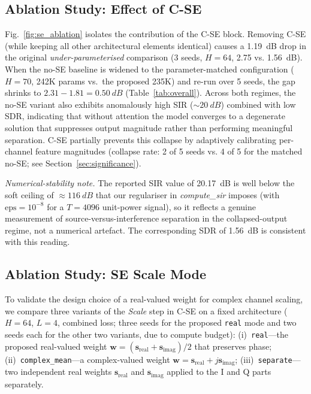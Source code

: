 \documentclass[twocolumn,english]{svjour3}
\begin{document}
\subsection{Ablation Study: Effect of C-SE}

Fig.~\ref{fig:se_ablation} isolates the contribution of the C-SE block. Removing C-SE (while keeping all other architectural elements identical) causes a \SI{1.19}{dB} drop in the original \emph{under-parameterised} comparison (3 seeds, $H{=}64$, \num{2.75} vs. \num{1.56}~dB). When the no-SE baseline is widened to the parameter-matched configuration ($H{=}70$, 242K params vs.\ the proposed 235K) and re-run over 5 seeds, the gap shrinks to $\num{2.31} - \num{1.81} = \SI{0.50}{dB}$ (Table~\ref{tab:overall}). Across both regimes, the no-SE variant also exhibits anomalously high SIR ($\sim\SI{20}{dB}$) combined with low SDR, indicating that without attention the model converges to a degenerate solution that suppresses output magnitude rather than performing meaningful separation. C-SE partially prevents this collapse by adaptively calibrating per-channel feature magnitudes (collapse rate: 2 of 5 seeds vs. 4 of 5 for the matched no-SE; see Section~\ref{sec:significance}).

\emph{Numerical-stability note.} The reported SIR value of \qty{20.17}{dB} is well below the soft ceiling of $\approx\SI{116}{dB}$ that our regulariser in \emph{compute\_sir} imposes (with $\text{eps}=10^{-8}$ for a $T{=}4096$ unit-power signal), so it reflects a genuine measurement of source-versus-interference separation in the collapsed-output regime, not a numerical artefact. The corresponding SDR of \qty{1.56}{dB} is consistent with this reading.

\subsection{Ablation Study: SE Scale Mode}

To validate the design choice of a real-valued weight for complex channel scaling, we compare three variants of the \emph{Scale} step in C-SE on a fixed architecture ($H{=}64$, $L{=}4$, combined loss; three seeds for the proposed \texttt{real} mode and two seeds each for the other two variants, due to compute budget):
(i)~\texttt{real}---the proposed real-valued weight $\mathbf{w}=(\mathbf{s}_{\text{real}}+\mathbf{s}_{\text{imag}})/2$ that preserves phase;
(ii)~\texttt{complex\_mean}---a complex-valued weight $\mathbf{w}=\mathbf{s}_{\text{real}}+j\mathbf{s}_{\text{imag}}$;
(iii)~\texttt{separate}---two independent real weights $\mathbf{s}_{\text{real}}$ and $\mathbf{s}_{\text{imag}}$ applied to the I and Q parts separately.
\end{document}
